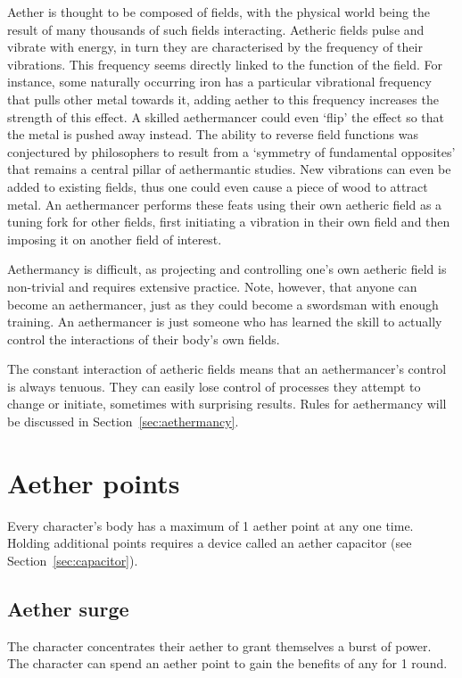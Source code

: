 \documentclass[a4paper,11pt,oneside]{book}
\newcommand{\textlf}[1]{\textbf{\titlecap{#1}}}
\begin{document}
Aether is thought to be composed of fields, with the physical world being the result of many thousands of such fields interacting. Aetheric fields pulse and vibrate with energy, in turn they are characterised by the frequency of their vibrations. This frequency seems directly linked to the function of the field. For instance, some naturally occurring iron has a particular vibrational frequency that pulls other metal towards it, adding aether to this frequency increases the strength of this effect. A skilled aethermancer could even `flip' the effect so that the metal is pushed away instead. The ability to reverse field functions was conjectured by philosophers to result from a `symmetry of fundamental opposites' that remains a central pillar of aethermantic studies. New vibrations can even be added to existing fields, thus one could even cause a piece of wood to attract metal. An aethermancer performs these feats using their own aetheric field as a tuning fork for other fields, first initiating a vibration in their own field and then imposing it on another field of interest.

Aethermancy is difficult, as projecting and controlling one's own aetheric field is non-trivial and requires extensive practice. Note, however, that anyone can become an aethermancer, just as they could become a swordsman with enough training. An aethermancer is just someone who has learned the skill to actually control the interactions of their body's own fields. 

The constant interaction of aetheric fields means that an aethermancer's control is always tenuous. They can easily lose control of processes they attempt to change or initiate, sometimes with surprising results. Rules for aethermancy will be discussed in Section~\ref{sec:aethermancy}.

\section{Aether points}
Every character's body has a maximum of 1 aether point at any one time. Holding additional points requires a device called an aether capacitor (see Section~\ref{sec:capacitor}). %

\subsection{Aether surge}
The character concentrates their aether to grant themselves a burst of power. The character can spend an aether point to gain the benefits of any \textlf{perk} for 1 round.
\end{document}
